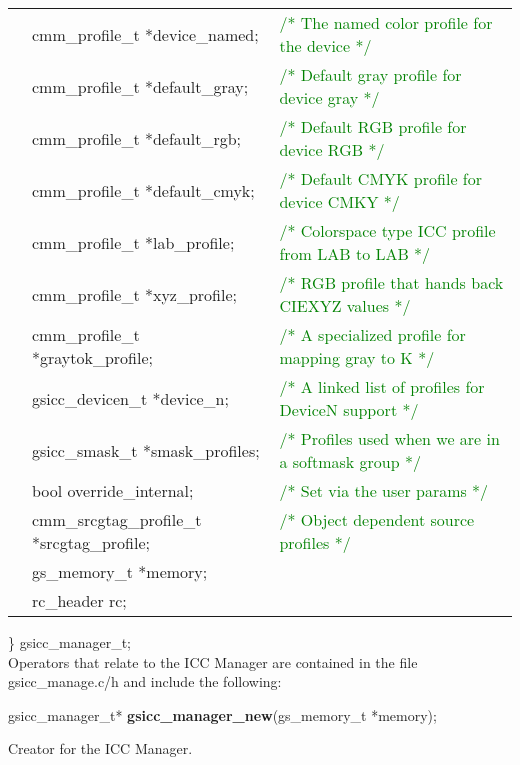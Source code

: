 \documentclass[12pt,notitlepage]{article}
\begin{document}
\begin{tabular}{lll}
  & cmm\_profile\_t *device\_named;   & 	\textcolor{green}{/* The named color profile for the device */}  \\
  & cmm\_profile\_t *default\_gray;   & 	\textcolor{green}{/* Default gray profile for device gray */}   \\
  & cmm\_profile\_t *default\_rgb;    &	 \textcolor{green}{/* Default RGB profile for device RGB */}    \\
  & cmm\_profile\_t *default\_cmyk;   & 	\textcolor{green}{/* Default CMYK profile for device CMKY */} \\
  & cmm\_profile\_t *lab\_profile;    &  \textcolor{green}{/* Colorspace type ICC profile from LAB to LAB */}   \\
  & cmm\_profile\_t *xyz\_profile;    &  \textcolor{green}{/* RGB profile that hands back CIEXYZ values */}   \\
  & cmm\_profile\_t *graytok\_profile;&  \textcolor{green}{/* A specialized profile for mapping gray to K */}   \\
  & gsicc\_devicen\_t *device\_n;     &  \textcolor{green}{/* A linked list of profiles for DeviceN support */} \\
  & gsicc\_smask\_t *smask\_profiles; &  \textcolor{green}{/* Profiles used when we are in a softmask group */ } \\
  & bool override\_internal; &  \textcolor{green}{/* Set via the user params */ } \\
  & cmm\_srcgtag\_profile\_t *srcgtag\_profile; &  \textcolor{green}{/* Object dependent source profiles */ } \\
  &       gs\_memory\_t *memory;    & \\
  &       rc\_header rc; &
\end{tabular}

\noindent  \} gsicc\_manager\_t;\\

\noindent Operators that relate to the ICC Manager are contained in the file gsicc\_manage.c/h and include the following:\\

\begin{tabbing}
\noindent gsicc\_manager\_t* {\bf gsicc\_manager\_new}(gs\_memory\_t *memory);\\
\end{tabbing}

\begin{minipage}[h]{6.0in}
Creator for the ICC Manager.
\end{minipage}\\
\\
\end{document}
